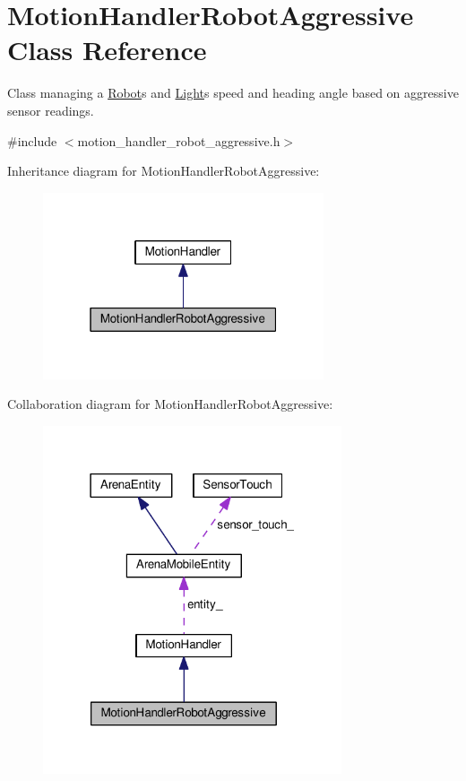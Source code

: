 \hypertarget{classMotionHandlerRobotAggressive}{}\section{Motion\+Handler\+Robot\+Aggressive Class Reference}
\label{classMotionHandlerRobotAggressive}


Class managing a \hyperlink{classRobot}{Robot}\textquotesingle{}s and \hyperlink{classLight}{Light}\textquotesingle{}s speed and heading angle based on aggressive sensor readings.  




{\ttfamily \#include $<$motion\+\_\+handler\+\_\+robot\+\_\+aggressive.\+h$>$}



Inheritance diagram for Motion\+Handler\+Robot\+Aggressive\+:\nopagebreak
\begin{figure}[H]
\begin{center}
\leavevmode
\includegraphics[width=235pt]{classMotionHandlerRobotAggressive__inherit__graph}
\end{center}
\end{figure}


Collaboration diagram for Motion\+Handler\+Robot\+Aggressive\+:\nopagebreak
\begin{figure}[H]
\begin{center}
\leavevmode
\includegraphics[width=250pt]{classMotionHandlerRobotAggressive__coll__graph}
\end{center}
\end{figure}
